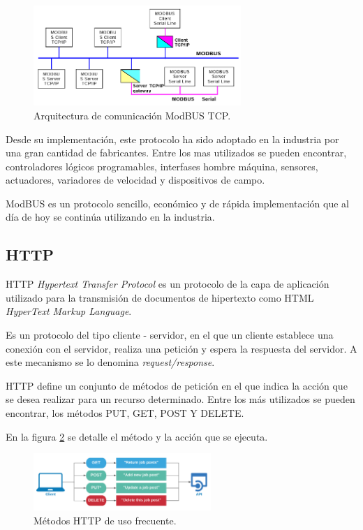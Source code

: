\begin{figure}[htbp]
	\centering
	\includegraphics[width=0.7\textwidth]{./Figures/ModBUS.png}
	\caption{Arquitectura de comunicación ModBUS TCP.}
	\label{fig:ModBUS}
\end{figure} 
Desde su implementación, este protocolo ha sido adoptado en la industria por una gran cantidad de fabricantes. Entre los mas utilizados se pueden encontrar, controladores lógicos programables, interfases hombre máquina, sensores, actuadores, variadores de velocidad y dispositivos de campo.

ModBUS es un protocolo sencillo, económico y de rápida implementación que al día de hoy se continúa utilizando en la industria. 

\subsection{HTTP}

HTTP \textit{Hypertext Transfer Protocol} es un protocolo de la capa de aplicación utilizado para la transmisión de documentos de hipertexto como HTML \textit{HyperText Markup Language}\citep{moz1}. 

Es un protocolo del tipo cliente - servidor, en el que un cliente establece una conexión con el servidor, realiza una petición y espera la respuesta del servidor. A este mecanismo se lo denomina \textit{request/response}. 

HTTP define un conjunto de métodos de petición en el que indica la acción que se desea realizar para un recurso determinado. Entre los más utilizados se pueden encontrar, los métodos PUT, GET, POST Y DELETE\citep{moz2}. 

En la figura \ref{fig:HTTP} se detalle el método y la acción que se ejecuta.

\begin{figure}[htbp]
	\centering
	\includegraphics[width=0.6\textwidth]{./Figures/HTTP.png}
	\caption{Métodos HTTP de uso frecuente.}
	\label{fig:HTTP}
\end{figure} 

